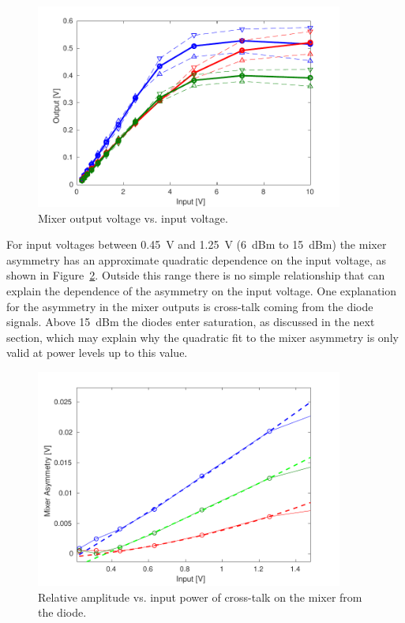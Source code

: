 \begin{figure}
  \centering
  \includegraphics[width=0.9\textwidth]{Figures/phaseMons/MixerVsVolts}
  \caption{Mixer output voltage vs. input voltage.}
  \label{f:MixerVsVolts}
\end{figure}

For input voltages between 0.45~V and 1.25~V (6~dBm to 15~dBm) the mixer asymmetry has an approximate quadratic dependence on the input voltage, as shown in Figure~\ref{f:MixerAsymmetryVsVolts}. Outside this range there is no simple relationship that can explain the dependence of the asymmetry on the input voltage. One explanation for the asymmetry in the mixer outputs is cross-talk coming from the diode signals. Above 15~dBm the diodes enter saturation, as discussed in the next section, which may explain why the quadratic fit to the mixer asymmetry is only valid at power levels up to this value. 

\begin{figure}
  \centering
  \includegraphics[width=0.9\textwidth]{Figures/phaseMons/MixerAsymmetryVsVolts}
  \caption{Relative amplitude vs. input power of cross-talk on the mixer from the diode.}
  \label{f:MixerAsymmetryVsVolts}
\end{figure}

